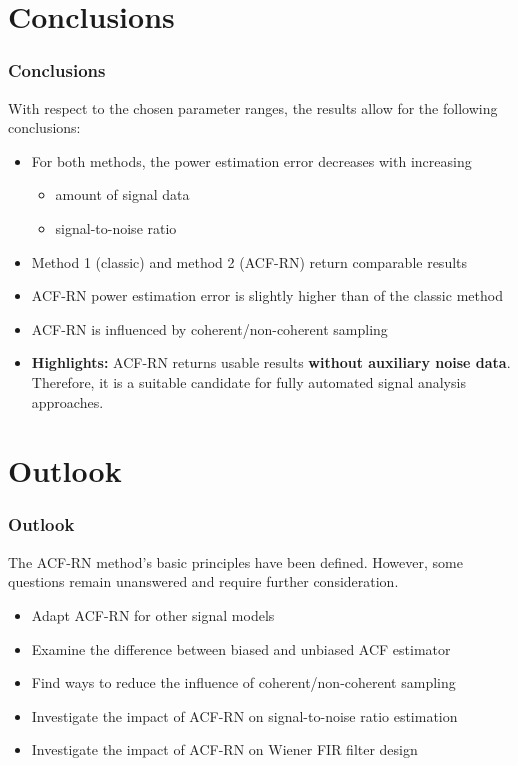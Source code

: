 \documentclass[11pt,aspectratio=169]{beamer}
\begin{document}
	\section{Conclusions}
	\begin{frame}
		\frametitle{Conclusions}
		With respect to the chosen parameter ranges, the results allow for the following conclusions:
		\vspace*{1em}
		\begin{itemize}
			\item For both methods, the power estimation error decreases with increasing
			\begin{itemize}
				\item amount of signal data
				\item signal-to-noise ratio
			\end{itemize}
			\item Method 1 (classic) and method 2 (ACF-RN) return comparable results
			\item ACF-RN power estimation error is slightly higher than of the classic method
			\item ACF-RN is influenced by coherent/non-coherent sampling
			\item \textbf{Highlights:} ACF-RN returns usable results \textbf{without auxiliary noise data}. Therefore, it is a suitable candidate for fully automated signal analysis approaches.
		\end{itemize}
	\end{frame}
	\section{Outlook}
	\begin{frame}
		\frametitle{Outlook}
		The ACF-RN method's basic principles have been defined. However, some questions remain unanswered and require further consideration.
		\vspace*{1em}
		\begin{itemize}
			\item Adapt ACF-RN for other signal models
			\item Examine the difference between biased and unbiased ACF estimator
			\item Find ways to reduce the influence of coherent/non-coherent sampling
			\item Investigate the impact of ACF-RN on signal-to-noise ratio estimation
			\item Investigate the impact of ACF-RN on Wiener FIR filter design
		\end{itemize}
	\end{frame}
\end{document}
